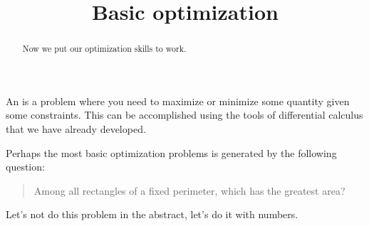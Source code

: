 \documentclass{ximera}
\title[Dig-In:]{Basic optimization}
\begin{document}
\begin{abstract}
  Now we put our optimization skills to work.
\end{abstract}
\maketitle

An  is a problem where you need to maximize
or minimize some quantity given some constraints. This can be
accomplished using the tools of differential calculus that we have
already developed.

Perhaps the most basic optimization problems is generated by the
following question:

\begin{quote}
  Among all rectangles of a fixed perimeter, which has the greatest area?
\end{quote}

Let's not do this problem in the abstract, let's do it with numbers.
\end{document}
